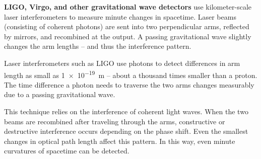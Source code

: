 \vspace{0.5em}
\textbf{LIGO, Virgo, and other gravitational wave detectors} use kilometer-scale laser interferometers to measure minute changes in spacetime. Laser beams (consisting of coherent photons) are sent into two perpendicular arms, reflected by mirrors, and recombined at the output. A passing gravitational wave slightly changes the arm lengths – and thus the interference pattern.

\vspace{1em}
\begin{tcolorbox}[physikbox, title=Photons as a Tool for Measuring Spacetime Curvature]
	\label{box:messwerkzeug}
	\small
	Laser interferometers such as LIGO use photons to detect differences in arm length as small as \SI{1e-19}{m} – about a thousand times smaller than a proton. The time difference a photon needs to traverse the two arms changes measurably due to a passing gravitational wave.
\end{tcolorbox}

This technique relies on the interference of coherent light waves. When the two beams are recombined after traveling through the arms, constructive or destructive interference occurs depending on the phase shift. Even the smallest changes in optical path length affect this pattern. In this way, even minute curvatures of spacetime can be detected.

